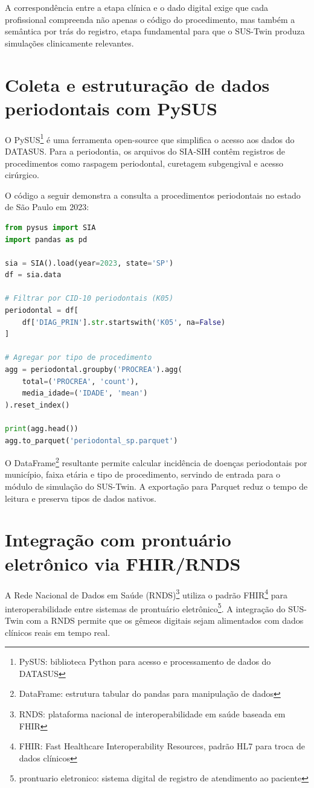 A correspondência entre a etapa clínica e o dado digital exige que cada profissional compreenda não apenas o código do procedimento, mas também a semântica por trás do registro, etapa fundamental para que o SUS-Twin produza simulações clinicamente relevantes.

\section{Coleta e estruturação de dados periodontais com PySUS}

O PySUS{\footnote{PySUS: biblioteca Python para acesso e processamento de dados do DATASUS}} é uma ferramenta open-source que simplifica o acesso aos dados do DATASUS. Para a periodontia, os arquivos do SIA-SIH contêm registros de procedimentos como raspagem periodontal, curetagem subgengival e acesso cirúrgico.

O código a seguir demonstra a consulta a procedimentos periodontais no estado de São Paulo em 2023:

\begin{lstlisting}[language=Python,caption={Consulta PySUS para procedimentos periodontais no SIA-SIH}]
from pysus import SIA
import pandas as pd

sia = SIA().load(year=2023, state='SP')
df = sia.data

# Filtrar por CID-10 periodontais (K05)
periodontal = df[
    df['DIAG_PRIN'].str.startswith('K05', na=False)
]

# Agregar por tipo de procedimento
agg = periodontal.groupby('PROCREA').agg(
    total=('PROCREA', 'count'),
    media_idade=('IDADE', 'mean')
).reset_index()

print(agg.head())
agg.to_parquet('periodontal_sp.parquet')
\end{lstlisting}

O DataFrame{\footnote{DataFrame: estrutura tabular do pandas para manipulação de dados}} resultante permite calcular incidência de doenças periodontais por município, faixa etária e tipo de procedimento, servindo de entrada para o módulo de simulação do SUS-Twin. A exportação para Parquet reduz o tempo de leitura e preserva tipos de dados nativos.

\section{Integração com prontuário eletrônico via FHIR/RNDS}

A Rede Nacional de Dados em Saúde (RNDS){\footnote{RNDS: plataforma nacional de interoperabilidade em saúde baseada em FHIR}} utiliza o padrão FHIR{\footnote{FHIR: Fast Healthcare Interoperability Resources, padrão HL7 para troca de dados clínicos}} para interoperabilidade entre sistemas de prontuário eletrônico{\footnote{prontuario eletronico: sistema digital de registro de atendimento ao paciente}}. A integração do SUS-Twin com a RNDS permite que os gêmeos digitais sejam alimentados com dados clínicos reais em tempo real.

